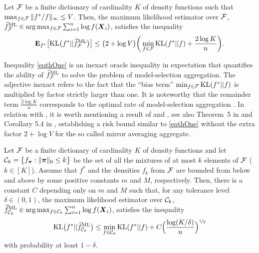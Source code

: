 \begin{theorem}\label{th:1}
	Let $\mathcal F$ be a finite dictionary of cardinality $K$ of density functions such that $\max_{f\in\mathcal F}\|f^*/f\|_\infty\le V$. Then, the maximum likelihood estimator
	over $\mathcal F$, $\widehat f^{\rm ML}_{\mathcal F}\in{\rm arg}\max_{f\in\mathcal F} \sum_{i=1}^n \log f(\boldsymbol X_i)$, satisfies the inequality
	\begin{equation}\label{eqthOne}
	\mathbf E_{f^*}\big[{\rm KL}\big(f^*||\widehat f^{\rm ML}_{\mathcal F}\big)\big] \le \big(2+\log V\big)\bigg(\min_{f\in\mathcal F} {\rm KL}(f^*|| f) + \frac{2\log K}{n}\bigg).
	\end{equation}
\end{theorem}
Inequality \eqref{eqthOne} is an inexact oracle inequality in expectation that quantifies the ability of $\widehat f^{\rm ML}_{\mathcal F}$
to solve the problem of model-selection aggregation. The adjective inexact refers to the fact that the ``bias term'' $\min_{f\in\mathcal F} {\rm KL}(f^*|| f)$
is multiplied by factor strictly larger than one. It is noteworthy that the remainder term $\frac{2\log K}{n}$ corresponds to the optimal rate
of model-selection aggregation \citep{Juditski00,Tsybakov03}. In relation with , it is worth mentioning a result of \citep{Yang2000} and \citep{Catoni97},
see also Theorem~5 in \citep{Lecue06} and Corollary 5.4 in \citep{JRT}, establishing a risk bound similar to \eqref{eqthOne} without the
extra factor $2+\log V$ for the so called mirror averaging aggregate.

\begin{theorem}\label{th:2}
	Let $\mathcal F$ be a finite dictionary of cardinality $K$ of density functions and let $\mathcal C_k=\big\{f_{\boldsymbol \pi}:\|\boldsymbol \pi\|_0\le k\big\}$ be the set of all
	the mixtures of at most $k$ elements of $\mathcal F$ ($k\in[K]$). Assume that $f^*$ and the densities $f_k$ from $\mathcal F$ are bounded from below and above
	by some positive constants $m$ and $M$, respectively. Then, there is a constant $C$ depending only on $m$ and $M$ such that, for any tolerance level
	$\delta\in(0,1)$, the maximum likelihood estimator
	over $\mathcal C_k$, $\widehat f^{\rm ML}_{\mathcal C_k}\in{\rm arg}\max_{f\in\mathcal C_k} \sum_{i=1}^n \log f(\boldsymbol X_i)$, satisfies the inequality
	\begin{equation}
	{\rm KL}\big(f^*||\widehat f^{\rm ML}_{\mathcal C_k}\big) \le \min_{f\in\mathcal C_k} {\rm KL}(f^*|| f) + C\Big(\frac{\log(K/\delta)}{n}\Big)^{\nicefrac12}
	\end{equation}
	with probability at least $1-\delta$.
\end{theorem}

